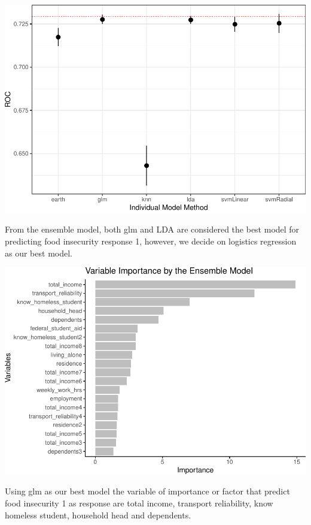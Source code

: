 \documentclass[
  10pt,
]{article}
\begin{document}
\begin{center}\includegraphics{phase2_report_files/figure-latex/unnamed-chunk-18-1} \end{center}

\hfill\break
From the ensemble model, both glm and LDA are considered the best model for predicting food insecurity response 1, however, we decide on logistics regression as our best model.\\

\begin{center}\includegraphics{phase2_report_files/figure-latex/unnamed-chunk-19-1} \end{center}

\hfill\break
Using glm as our best model the variable of importance or factor that predict food insecurity 1 as response are total income, transport reliability, know homeless student, household head and dependents.\\
\end{document}
